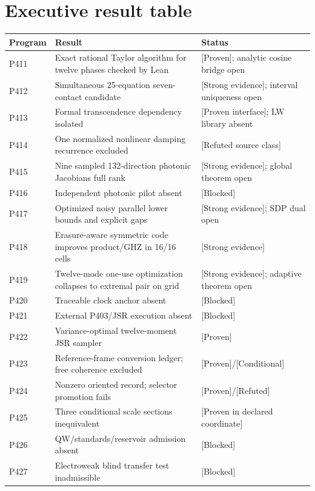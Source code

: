 \documentclass[11pt,a4paper,openany]{report}
\newcommand{\statusProven}{\textcolor{fingreen}{[Proven]}}
\newcommand{\statusStrong}{\textcolor{finblue}{[Strong evidence]}}
\newcommand{\statusRefuted}{\textcolor{finred}{[Refuted]}}
\begin{document}
\chapter{Executive result table}

\begin{center}
\begingroup\small
\setlength{\tabcolsep}{2.5pt}
\renewcommand{\arraystretch}{1.16}
\begin{longtable}{@{}p{}p{}p{}@{}}
\toprule
\textbf{Program} & \textbf{Result} & \textbf{Status} \\
\midrule
\endhead
P411 & Exact rational Taylor algorithm for twelve phases checked by Lean & \statusProven{}; analytic cosine bridge open \\
P412 & Simultaneous 25-equation seven-contact candidate & \statusStrong{}; interval uniqueness open \\
P413 & Formal transcendence dependency isolated & [Proven interface]; LW library absent \\
P414 & One normalized nonlinear damping recurrence excluded & [Refuted source class] \\
P415 & Nine sampled 132-direction photonic Jacobians full rank & \statusStrong{}; global theorem open \\
P416 & Independent photonic pilot absent & [Blocked] \\
P417 & Optimized noisy parallel lower bounds and explicit gaps & \statusStrong{}; SDP dual open \\
P418 & Erasure-aware symmetric code improves product/\allowbreak{}GHZ in 16/\allowbreak{}16 cells & \statusStrong{} \\
P419 & Twelve-mode one-use optimization collapses to extremal pair on grid & \statusStrong{}; adaptive theorem open \\
P420 & Traceable clock anchor absent & [Blocked] \\
P421 & External P403/\allowbreak{}JSR execution absent & [Blocked] \\
P422 & Variance-optimal twelve-moment JSR sampler & \statusProven{} \\
P423 & Reference-frame conversion ledger; free coherence excluded & \statusProven{}/\allowbreak{}[Conditional] \\
P424 & Nonzero oriented record; selector promotion fails & \statusProven{}/\allowbreak{}\statusRefuted{} \\
P425 & Three conditional scale sections inequivalent & [Proven in declared coordinate] \\
P426 & QW/\allowbreak{}standards/\allowbreak{}reservoir admission absent & [Blocked] \\
P427 & Electroweak blind transfer test inadmissible & [Blocked] \\
\bottomrule
\end{longtable}
\endgroup
\end{center}
\end{document}
